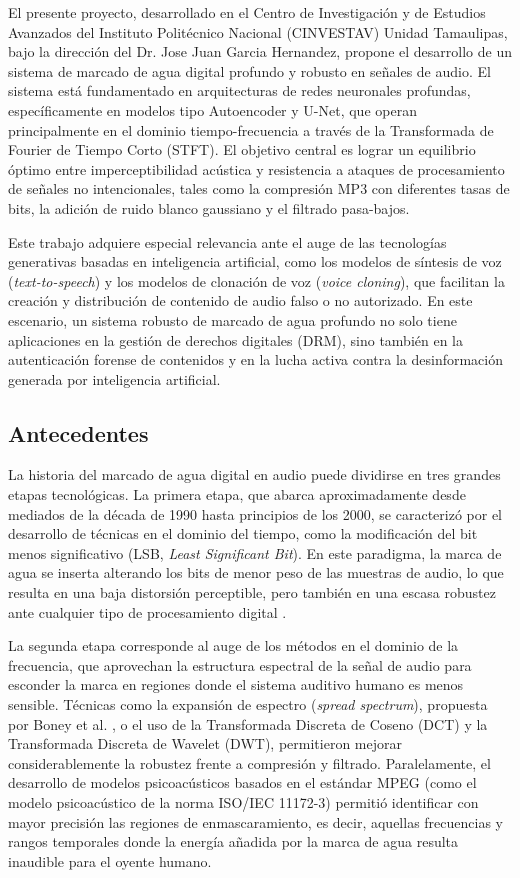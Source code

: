 El presente proyecto, desarrollado en el Centro de Investigación y de Estudios Avanzados del Instituto Politécnico Nacional (CINVESTAV) Unidad Tamaulipas, bajo la dirección del Dr. Jose Juan Garcia Hernandez, propone el desarrollo de un sistema de marcado de agua digital profundo y robusto en señales de audio. El sistema está fundamentado en arquitecturas de redes neuronales profundas, específicamente en modelos tipo Autoencoder y U-Net, que operan principalmente en el dominio tiempo-frecuencia a través de la Transformada de Fourier de Tiempo Corto (STFT). El objetivo central es lograr un equilibrio óptimo entre imperceptibilidad acústica y resistencia a ataques de procesamiento de señales no intencionales, tales como la compresión MP3 con diferentes tasas de bits, la adición de ruido blanco gaussiano y el filtrado pasa-bajos.

Este trabajo adquiere especial relevancia ante el auge de las tecnologías generativas basadas en inteligencia artificial, como los modelos de síntesis de voz (\textit{text-to-speech}) y los modelos de clonación de voz (\textit{voice cloning}), que facilitan la creación y distribución de contenido de audio falso o no autorizado. En este escenario, un sistema robusto de marcado de agua profundo no solo tiene aplicaciones en la gestión de derechos digitales (DRM), sino también en la autenticación forense de contenidos y en la lucha activa contra la desinformación generada por inteligencia artificial.

\subsection{Antecedentes}
\label{sec:antecedentes}

La historia del marcado de agua digital en audio puede dividirse en tres grandes etapas tecnológicas. La primera etapa, que abarca aproximadamente desde mediados de la década de 1990 hasta principios de los 2000, se caracterizó por el desarrollo de técnicas en el dominio del tiempo, como la modificación del bit menos significativo (LSB, \textit{Least Significant Bit}). En este paradigma, la marca de agua se inserta alterando los bits de menor peso de las muestras de audio, lo que resulta en una baja distorsión perceptible, pero también en una escasa robustez ante cualquier tipo de procesamiento digital \cite{arnold2000audio}.

La segunda etapa corresponde al auge de los métodos en el dominio de la frecuencia, que aprovechan la estructura espectral de la señal de audio para esconder la marca en regiones donde el sistema auditivo humano es menos sensible. Técnicas como la expansión de espectro (\textit{spread spectrum}), propuesta por Boney et al. \cite{boney1996digital}, o el uso de la Transformada Discreta de Coseno (DCT) y la Transformada Discreta de Wavelet (DWT), permitieron mejorar considerablemente la robustez frente a compresión y filtrado. Paralelamente, el desarrollo de modelos psicoacústicos basados en el estándar MPEG (como el modelo psicoacústico de la norma ISO/IEC 11172-3) permitió identificar con mayor precisión las regiones de enmascaramiento, es decir, aquellas frecuencias y rangos temporales donde la energía añadida por la marca de agua resulta inaudible para el oyente humano.

